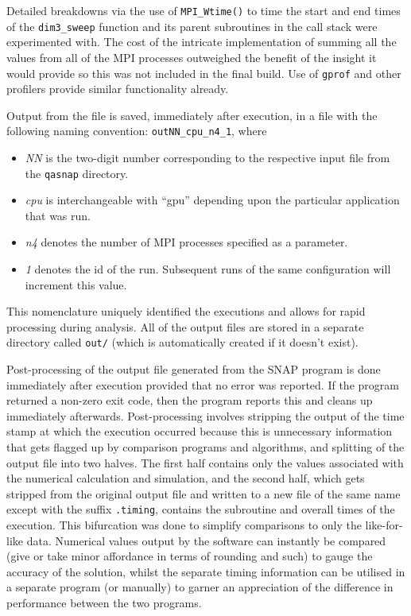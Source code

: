 \documentclass[conference]{IEEEtran}
\begin{document}
Detailed breakdowns via the use of \texttt{MPI\_Wtime()} to time the start and end times of the \texttt{dim3\_sweep} function and its parent subroutines in the call stack were experimented with. The cost of the intricate implementation of summing all the values from all of the MPI processes outweighed the benefit of the insight it would provide so this was not included in the final build. Use of \texttt{gprof} and other profilers provide similar functionality already.

Output from the file is saved, immediately after execution, in a file with the following naming convention: \texttt{outNN\_cpu\_n4\_1}, where

\begin{itemize}
    \item \textit{NN} is the two-digit number corresponding to the respective input file from the \texttt{qasnap} directory.
    \item \textit{cpu} is interchangeable with ``gpu'' depending upon the particular application that was run.
    \item \textit{n4} denotes the number of MPI processes specified as a parameter.
    \item \textit{1} denotes the id of the run. Subsequent runs of the same configuration will increment this value.
\end{itemize}

This nomenclature uniquely identified the executions and allows for rapid processing during analysis. All of the output files are stored in a separate directory called \texttt{out/} (which is automatically created if it doesn't exist).

Post-processing of the output file generated from the SNAP program is done immediately after execution provided that no error was reported. If the program returned a non-zero exit code, then the program reports this and cleans up immediately afterwards. Post-processing involves stripping the output of the time stamp at which the execution occurred because this is unnecessary information that gets flagged up by comparison programs and algorithms, and splitting of the output file into two halves. The first half contains only the values associated with the numerical calculation and simulation, and the second half, which gets stripped from the original output file and written to a new file of the same name except with the suffix \texttt{.timing}, contains the subroutine and overall times of the execution. This bifurcation was done to simplify comparisons to only the like-for-like data. Numerical values output by the software can instantly be compared (give or take minor affordance in terms of rounding and such) to gauge the accuracy of the solution, whilst the separate timing information can be utilised in a separate program (or manually) to garner an appreciation of the difference in performance between the two programs.
\end{document}
